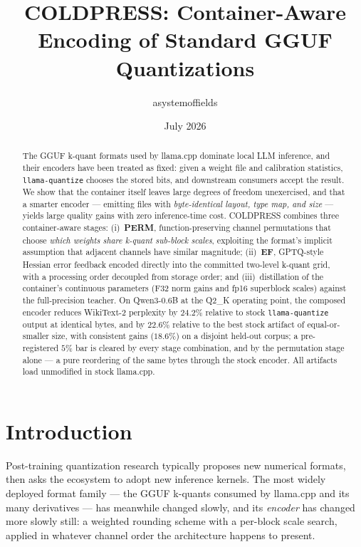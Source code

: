 \documentclass[11pt]{article}
\title{COLDPRESS: Container-Aware Encoding of Standard GGUF Quantizations}
\author{asystemoffields}
\date{July 2026}
\begin{document}
\maketitle

\begin{abstract}
The GGUF k-quant formats used by llama.cpp dominate local LLM inference, and their
encoders have been treated as fixed: given a weight file and calibration statistics,
\texttt{llama-quantize} chooses the stored bits, and downstream consumers accept the
result. We show that the container itself leaves large degrees of freedom unexercised,
and that a smarter encoder --- emitting files with \emph{byte-identical layout, type
map, and size} --- yields large quality gains with zero inference-time cost. COLDPRESS
combines three container-aware stages: (i)~\textbf{PERM}, function-preserving channel
permutations that choose \emph{which weights share k-quant sub-block scales},
exploiting the format's implicit assumption that adjacent channels have similar
magnitude; (ii)~\textbf{EF}, GPTQ-style Hessian error feedback encoded directly into
the committed two-level k-quant grid, with a processing order decoupled from storage
order; and (iii)~distillation of the container's continuous parameters (F32 norm
gains and fp16 superblock scales) against the full-precision teacher. On Qwen3-0.6B
at the Q2\_K operating point, the composed encoder reduces WikiText-2 perplexity by
$24.2\%$ relative to stock \texttt{llama-quantize} output at identical bytes, and by
$22.6\%$ relative to the best stock artifact of equal-or-smaller size, with consistent
gains ($18.6\%$) on a disjoint held-out corpus; a pre-registered $5\%$ bar is cleared
by every stage combination, and by the permutation stage alone --- a pure reordering
of the same bytes through the stock encoder. All artifacts load unmodified in stock
llama.cpp.
\end{abstract}

\section{Introduction}

Post-training quantization research typically proposes new numerical formats, then
asks the ecosystem to adopt new inference kernels. The most widely deployed format
family --- the GGUF k-quants consumed by llama.cpp and its many derivatives --- has
meanwhile changed slowly, and its \emph{encoder} has changed more slowly still: a
weighted rounding scheme with a per-block scale search, applied in whatever channel
order the architecture happens to present.
\end{document}
